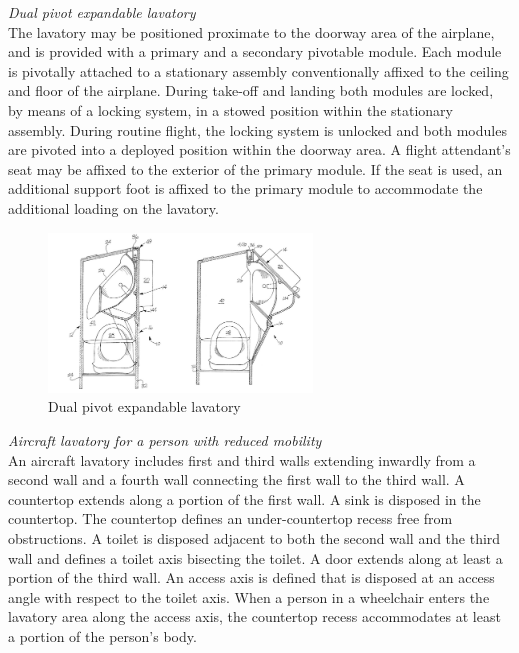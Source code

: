\noindent\emph{Dual pivot expandable lavatory}\\ The lavatory may be positioned proximate to the doorway area of the airplane, and is provided with a primary and a secondary pivotable module. Each module is pivotally attached to a stationary assembly conventionally affixed to the ceiling and floor of the airplane. During take-off and landing both modules are locked, by means of a locking system, in a stowed position within the stationary assembly. During routine flight, the locking system is unlocked and both modules are pivoted into a deployed position within the doorway area. A flight attendant's seat may be affixed to the exterior of the primary module. If the seat is used, an additional support foot is affixed to the primary module to accommodate the additional loading on the lavatory.\cite{arnold2000dual} \\

\begin{figure}[h]
\centering
\includegraphics[width=7cm]{brazil_images/image016.png}
\caption{Dual pivot expandable lavatory}
\label{fig:expandable_lavatory}
\end{figure}

\noindent\emph{Aircraft lavatory for a person with reduced mobility}\\
 An aircraft lavatory includes first and third walls extending inwardly from a second wall and a fourth wall connecting the first wall to the third wall. A countertop extends along a portion of the first wall. A sink is disposed in the countertop. The countertop defines an under-countertop recess free from obstructions. A toilet is disposed adjacent to both the second wall and the third wall and defines a toilet axis bisecting the toilet. A door extends along at least a portion of the third wall. An access axis is defined that is disposed at an access angle with respect to the toilet axis. When a person in a wheelchair enters the lavatory area along the access axis, the countertop recess accommodates at least a portion of the person's body.\cite{grant2012aircraft}\\ 

